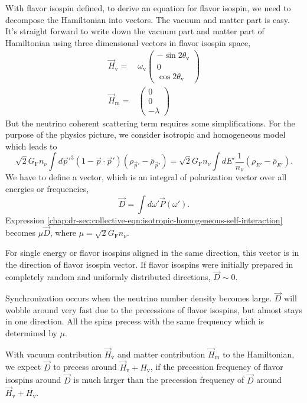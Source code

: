 With flavor isospin defined, to derive an equation for flavor isospin, we need to decompose the Hamiltonian into vectors. The vacuum and matter part is easy. It's straight forward to write down the vacuum part and matter part of Hamiltonian using three dimensional vectors in flavor isospin space,
\begin{align*}
   \vec H_{\mathrm v} = & \omega_{\mathrm v}\begin{pmatrix}
   -\sin 2\theta_{\mathrm v}\\
   0\\
   \cos 2\theta_{\mathrm v}
   \end{pmatrix}\\
   \vec H_{\mathrm m} = & \begin{pmatrix}
   0\\
   0\\
   -\lambda
   \end{pmatrix}
\end{align*}
But the neutrino coherent scattering term requires some simplifications. For the purpose of the physics picture, we consider isotropic and homogeneous model which leads to
\begin{equation}
   \sqrt{2}G_{\mathrm F} n_\nu \int d\vec p'^3 (1-\vec p \cdot \vec p') (\rho_{\vec p'} - \bar\rho_{\vec p'}) = \sqrt{2}G_{\mathrm F} n_\nu \int dE' \frac{1}{n_\nu}(\rho_{E'} - \bar\rho_{E'}).
   \label{chap:dr-sec:collective-eqn:isotropic-homogeneous-self-interaction}
\end{equation}
We have to define a vector, which is an integral of polarization vector over all energies or frequencies,
\begin{equation}
   \vec D = \int d\omega' \vec P(\omega').
\end{equation}
Expression \ref{chap:dr-sec:collective-eqn:isotropic-homogeneous-self-interaction} becomes $\mu \vec D$, where $\mu = \sqrt{2}G_{\mathrm F} n_\nu$.

For single energy or flavor isospins aligned in the same direction, this vector is in the direction of flavor isospin vector. If flavor isospins were initially prepared in completely random and uniformly distributed directions, $\vec D\sim 0$.

Synchronization occurs when the neutrino number density becomes large. $\vec D$ will wobble around very fast due to the precessions of flavor isospins, but almost stays in one direction. All the spins precess with the same frequency which is determined by $\mu$.

With vacuum contribution $\vec H_{\mathrm v}$ and matter contribution $\vec H_{\mathrm m}$ to the Hamiltonian, we expect $\vec D$ to precess around $\vec H_{\mathrm v} + H_{\mathrm v}$, if the precession frequency of flavor isospins around $\vec D$ is much larger than the precession frequency of $\vec D$ around  $\vec H_{\mathrm v} + H_{\mathrm v}$.





